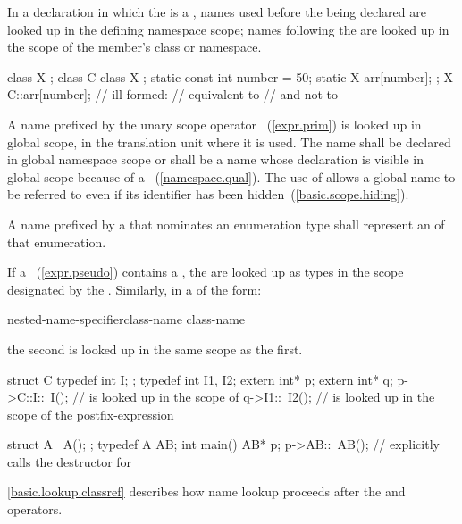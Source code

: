 \pnum
In a declaration in which the  is a
, names used before the 
being declared are looked up in the defining namespace scope; names
following the  are looked up in the scope of the
member's class or namespace. \begin{example}

\begin{codeblock}
class X { };
class C {
  class X { };
  static const int number = 50;
  static X arr[number];
};
X C::arr[number];   // ill-formed:
                    // equivalent to  
                    // and not to  
\end{codeblock}
\end{example}

\pnum
{}%
%
A name prefixed by the unary scope operator \tcode{::}~(\ref{expr.prim})
is looked up in global scope, in the translation unit where it is used.
The name shall be declared in global namespace scope or shall be a name
whose declaration is visible in global scope because of a
~(\ref{namespace.qual}). The use of \tcode{::}
allows a global name to be referred to even if its identifier has been
hidden~(\ref{basic.scope.hiding}).

\pnum
A name prefixed by a  that
nominates an enumeration type shall represent an 
of that enumeration.

\pnum
If a ~(\ref{expr.pseudo}) contains a
, the  are looked
up as types in the scope designated by the
. Similarly, in a
 of the form:

\begin{ncbnf}
nested-name-specifier\opt class-name \terminal{::} \terminal{\tilde} class-name
\end{ncbnf}

the second  is looked up in the same scope as the
first. \begin{example}

\begin{codeblock}
struct C {
  typedef int I;
};
typedef int I1, I2;
extern int* p;
extern int* q;
p->C::I::~I();      //  is looked up in the scope of 
q->I1::~I2();       //  is looked up in the scope of the postfix-expression

struct A {
  ~A();
};
typedef A AB;
int main() {
  AB* p;
  p->AB::~AB();     // explicitly calls the destructor for 
}
\end{codeblock}
\end{example} \begin{note} \ref{basic.lookup.classref} describes how name
lookup proceeds after the  and \tcode{->} operators. \end{note}

